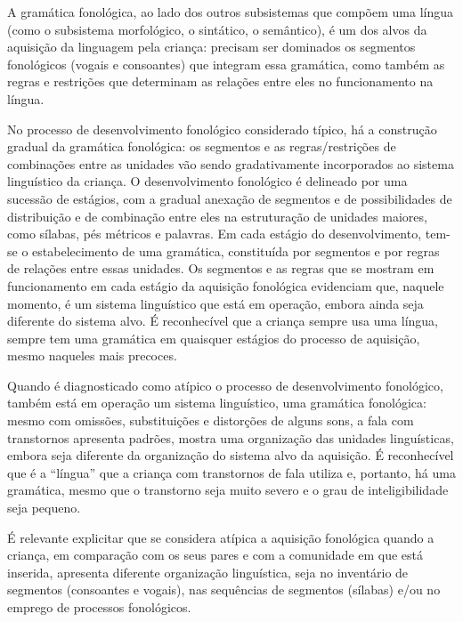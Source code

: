 \documentclass[output=paper,colorlinks,citecolor=brown,booklanguage=portuguese]{langscibook}
\begin{document}
A gramática fonológica, ao lado dos outros subsistemas que compõem uma língua (como o subsistema morfológico, o sintático, o semântico), é um dos alvos da aquisição da linguagem pela criança: precisam ser dominados os segmentos fonológicos (vogais e consoantes) que integram essa gramática, como também as regras e restrições que determinam as relações entre eles no funcionamento na língua. 

No processo de desenvolvimento fonológico considerado típico, há a construção gradual da gramática fonológica: os segmentos e as regras/restrições de combinações entre as unidades vão sendo gradativamente incorporados ao sistema linguístico da criança. O desenvolvimento fonológico é delineado por uma sucessão de estágios, com a gradual anexação de segmentos e de possibilidades de distribuição e de combinação entre eles na estruturação de unidades maiores, como sílabas, pés métricos e palavras. Em cada estágio do desenvolvimento, tem-se o estabelecimento de uma gramática, constituída por segmentos e por regras de relações entre essas unidades. Os segmentos e as regras que se mostram em funcionamento em cada estágio da aquisição fonológica evidenciam que, naquele momento, é um sistema linguístico que está em operação, embora ainda seja diferente do sistema alvo. É reconhecível que a criança sempre usa uma língua, sempre tem uma gramática em quaisquer estágios do processo de aquisição, mesmo naqueles mais precoces.

Quando é diagnosticado como atípico o processo de desenvolvimento fonológico, também está em operação um sistema linguístico, uma gramática fonológica: mesmo com omissões, substituições e distorções de alguns sons, a fala com transtornos apresenta padrões, mostra uma organização das unidades linguísticas, embora seja diferente da organização do sistema alvo da aquisição. É reconhecível que é a “língua” que a criança com transtornos de fala utiliza e, portanto, há uma gramática, mesmo que o transtorno seja muito severo e o grau de inteligibilidade seja pequeno.

É relevante explicitar que se considera atípica a aquisição fonológica quando a criança, em comparação com os seus pares e com a comunidade em que está inserida, apresenta diferente organização linguística, seja no inventário de segmentos (consoantes e vogais), nas sequências de segmentos (sílabas) e/ou no emprego de processos fonológicos.
\end{document}
